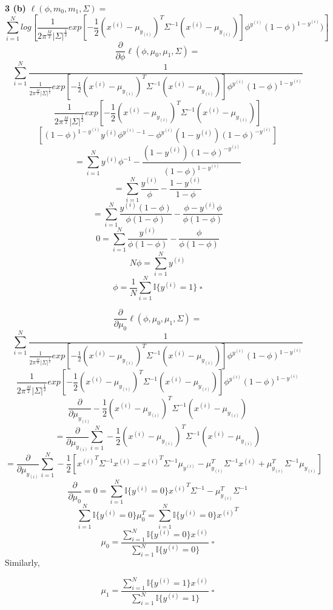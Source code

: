 \documentclass[12 pt]{article}        	%
\begin{document}
\textbf{3 (b)} $ \ell (\phi, m_0, m_1, \Sigma) = $
\[
  \sum_{i=1}^{N} log [ \frac{1}{2 \pi^{\frac{M}{2}} |\Sigma|^{\frac{1}{2}}} 
  exp[ - \frac{1}{2} (x^{(i)} - \mu_{y_{(i)}})^T \Sigma^{-1} (x^{(i)} - \mu_{y_{(i)}}) ] 
  \phi^{y^{(i)}} (1 - \phi)^{1 - y^{(i)}}) ]
\]
\[
  \frac{\partial}{\partial \phi} \ell (\phi, \mu_0, \mu_1, \Sigma) = 
\]
\[
  \sum_{i=1}^{N} \frac{1}{
    \frac{1}{2 \pi^{\frac{M}{2}} |\Sigma|^{\frac{1}{2}}} 
    exp[ - \frac{1}{2} (x^{(i)} - \mu_{y_{(i)}})^T \Sigma^{-1} (x^{(i)} - \mu_{y_{(i)}}) ] 
    \phi^{y^{(i)}} (1 - \phi)^{1 - y^{(i)}} 
  }
\]
\[
  \frac{1}{2 \pi^{\frac{M}{2}} |\Sigma|^{\frac{1}{2}}} 
  exp[ - \frac{1}{2} (x^{(i)} - \mu_{y_{(i)}})^T \Sigma^{-1} (x^{(i)} - \mu_{y_{(i)}}) ] 
\]
\[
  [ (1 - \phi)^{1 - y^{(i)}} y^{(i)} \phi^{y^{(i)} - 1}
  - \phi^{y^{(i)}} (1 - y^{(i)}) (1 - \phi)^{-y^{(i)}} ]
\]
\[
  = \sum_{i=1}^{N}
    y^{(i)} \phi^{-1}
    - \frac{
      (1 - y^{(i)}) (1 - \phi)^{-y^{(i)}}
    }{
      (1 - \phi)^{1 - y^{(i)}}
    }
\]
\[
  = \sum_{i=1}^{N}
  \frac{ y^{(i)} } { \phi }
    - \frac{
      1 - y^{(i)} 
    }{
      1 - \phi
    }
\]
\[
  = \sum_{i=1}^{N}
  \frac{ y^{(i)} ( 1 - \phi )} { \phi ( 1 - \phi )}
    - \frac{
      \phi - y^{(i)} \phi 
    }{
      \phi( 1 - \phi )
    }
\]
\[
  0 = \sum_{i=1}^{N}
  \frac{ y^{(i)} } 
  { \phi ( 1 - \phi )}
  - \frac{ \phi } 
  { \phi ( 1 - \phi )}
\]
\[
  N \phi  
  = 
  \sum_{i=1}^{N}
  y^{(i)}
\]
\[
  \phi  
  = \frac{1}{N}
  \sum_{i=1}^{N}
  \mathbb{I} \{ y^{(i)} = 1\} \; \square
\]

\[
  \frac{\partial}{\partial \mu_0} \ell (\phi, \mu_0, \mu_1, \Sigma) = 
\]
\[
  \sum_{i=1}^{N} \frac{1}{ 
    \frac{1}{2 \pi^{\frac{M}{2}} |\Sigma|^{\frac{1}{2}}} 
    exp[ - \frac{1}{2} (x^{(i)} - \mu_{y_{(i)}})^T \Sigma^{-1} (x^{(i)} - \mu_{y_{(i)}}) ] 
    \phi^{y^{(i)}} (1 - \phi)^{1 - y^{(i)}}
  }
\]
\[
  \frac{1}{2 \pi^{\frac{M}{2}} |\Sigma|^{\frac{1}{2}}}
  exp[ - \frac{1}{2} (x^{(i)} - \mu_{y_{(i)}})^T \Sigma^{-1} (x^{(i)} - \mu_{y_{(i)}}) ] 
  \phi^{y^{(i)}} (1 - \phi)^{1 - y^{(i)}}
\]
\[
  \frac{\partial}{\partial \mu_{y_{(i)}}} - \frac{1}{2} (x^{(i)} - \mu_{y_{(i)}})^T \Sigma^{-1} (x^{(i)} - \mu_{y_{(i)}})
\]
\[
  = \frac{\partial}{\partial \mu_{y_{(i)}}} \sum_{i=1}^{N} - \frac{1}{2} (x^{(i)} - \mu_{y_{(i)}})^T \Sigma^{-1} (x^{(i)} - \mu_{y_{(i)}})
\]
\[
  = \frac{\partial} {\partial \mu_{y_{(i)}}} \sum_{i=1}^{N} 
  - \frac{1}{2} 
  [
    {x^{(i)}}^T \Sigma^{-1} x^{(i)} 
    - {x^{(i)}}^T \Sigma^{-1} \mu_{y^(i)}
    - \mu_{y_{(i)}}^T \Sigma^{-1} x^{(i)}
    + \mu_{y_{(i)}}^T \Sigma^{-1} \mu_{y_{(i)}}
  ]
\]
\[
  \frac{\partial} {\partial \mu_0} = 0 = \sum_{i=1}^{N} 
  \mathbb{I} \{ y^{(i)} = 0 \} {x^{(i)}}^T \Sigma^{-1} 
    - \mu_{y_{(i)}}^T \Sigma^{-1}
\]
\[
  \sum_{i=1}^{N} \mathbb{I} \{ y^{(i)} = 0 \} \mu_{0}^T = \sum_{i=1}^{N} 
    \mathbb{I} \{ y^{(i)} = 0 \} {x^{(i)}}^T
\]
\[
  \mu_{0} = \frac{ 
    \sum_{i=1}^{N} 
    \mathbb{I} \{ y^{(i)} = 0 \} {x^{(i)}}
  }{
    \sum_{i=1}^{N} \mathbb{I} \{ y^{(i)} = 0 \}
  } \; \square
\]
Similarly, 

\[
  \mu_{1} = \frac{ 
    \sum_{i=1}^{N} 
    \mathbb{I} \{ y^{(i)} = 1 \} {x^{(i)}}
  }{
    \sum_{i=1}^{N} \mathbb{I} \{ y^{(i)} = 1 \}
  } \; \square
\]
\end{document}
